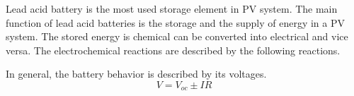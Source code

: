 Lead acid battery is the most used storage element in PV system. The main function of lead acid batteries is the storage and the supply of energy in a PV system. The stored energy is chemical can be converted into electrical and vice versa. The electrochemical reactions are described by the following reactions.

In general, the battery behavior is described by its voltages.
$$
V=V_{o c} \pm I R
$$
